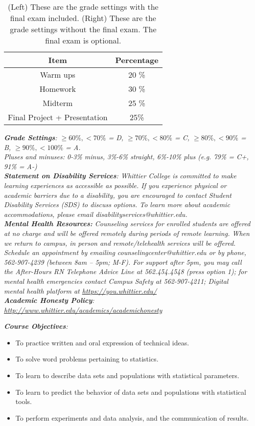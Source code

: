 \documentclass[10pt]{article}
\begin{document}
\begin{table}[h]
\centering
\begin{tabular}{| c | c |}
\hline
Item & Percentage \\ \hline \hline
Warm ups & 20 \% \\ \hline
Homework & 30 \% \\ \hline
Midterm & 25 \% \\ \hline
Final Project + Presentation & 25\% \\ \hline
\end{tabular}
\caption{\label{tab:grades} (Left) These are the grade settings with the final exam included. (Right) These are the grade settings without the final exam.  The final exam is optional.}
\end{table}
\vspace{0.5cm}
\noindent
\textit{\textbf{Grade Settings}: $\geq 60\%, <70\%$ = D, $\geq 70\%, <80\%$ = C, $\geq 80\%, <90\%$ = B, $\geq 90\%, <100\%$ = A.  \\ Pluses and minuses: 0-3\% minus, 3\%-6\% straight, 6\%-10\% plus (e.g. 79\% = C+, 91\% = A-)} \\
\textit{\textbf{Statement on Disability Services}: Whittier College is committed to make learning experiences as accessible as possible. If you experience physical or academic barriers due to a disability, you are encouraged to contact Student Disability Services (SDS) to discuss options. To learn more about academic accommodations, please email disabilityservices@whittier.edu.} \\
\textit{\textbf{Mental Health Resources:} Counseling services for enrolled students are offered at no charge and will be offered remotely during periods of remote learning. When we return to campus, in person and remote/telehealth services will be offered. Schedule an appointment by emailing counselingcenter@whittier.edu  or by phone, 562-907-4239 (between 8am – 5pm; M-F). For support after 5pm, you may call the After-Hours RN Telephone Advice Line at 562.454.4548 (press option 1); for mental health emergencies contact Campus Safety at 562-907-4211; Digital mental health platform at \url{https://you.whittier.edu/}} \\
\textit{\textbf{Academic Honesty Policy}: \url{http://www.whittier.edu/academics/academichonesty}}

\clearpage

\textit{\textbf{Course Objectives}:}
\begin{itemize}
\item To practice written and oral expression of technical ideas.
\item To solve word problems pertaining to statistics.
\item To learn to describe data sets and populations with statistical parameters.
\item To learn to predict the behavior of data sets and populations with statistical tools.
\item To perform experiments and data analysis, and the communication of results.
\end{itemize}
\end{document}

